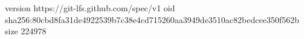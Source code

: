 version https://git-lfs.github.com/spec/v1
oid sha256:80cbd8fa31de4922539b7c38e4cd715260aa3949de3510ac82bedcee350f562b
size 224978
